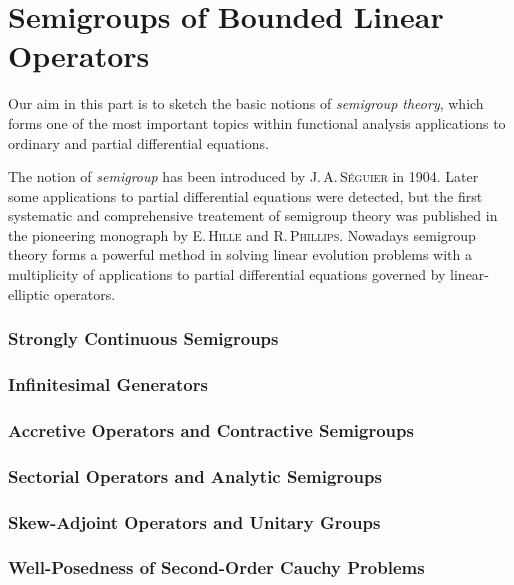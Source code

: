 \documentclass[11pt,twoside]{article}
\begin{document}
\newpage
\thispagestyle{empty}
\part{Semigroups of Bounded Linear Operators}                                  %
Our aim in this part
is to sketch the basic notions of \textit{semigroup theory},
which forms one of the most important topics within functional analysis
{\wrt} applications to ordinary and partial differential equations.

\subparagraph{}
The notion of \textit{semigroup} has been introduced
by \textsc{J.\,A.\,S\'{e}guier} in 1904.
Later some applications to partial differential equations were detected,
but the first systematic and comprehensive treatement of semigroup theory
was published in the pioneering monograph \cite{X_HP}
by \textsc{E.\,Hille} and \textsc{R.\,Phillips}.
Nowadays semigroup theory forms a powerful method
in solving linear evolution problems
with a multiplicity of applications to partial differential equations
governed by linear-elliptic operators.

\section{Strongly Continuous Semigroups}
\section{Infinitesimal Generators}
\section{Accretive Operators and Contractive Semigroups}
\section{Sectorial Operators and Analytic Semigroups}
\section{Skew-Adjoint Operators and Unitary Groups}
\section{Well-Posedness of Second-Order Cauchy Problems}
\end{document}
